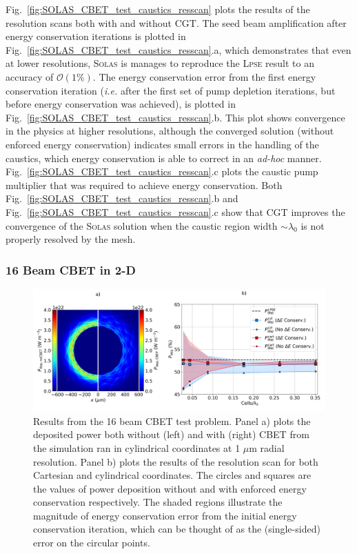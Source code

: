 Fig.~\ref{fig:SOLAS_CBET_test_caustics_resscan} plots the results of the resolution scans both with and without \ac{CGT}.
The seed beam amplification after energy conservation iterations is plotted in Fig.~\ref{fig:SOLAS_CBET_test_caustics_resscan}.a, which demonstrates that even at lower resolutions, \textsc{Solas} is manages to reproduce the \textsc{Lpse} result to an accuracy of $\mathcal{O}(1\%)$.
The energy conservation error from the first energy conservation iteration (\textit{i.e.} after the first set of pump depletion iterations, but before energy conservation was achieved), is plotted in Fig.~\ref{fig:SOLAS_CBET_test_caustics_resscan}.b.
This plot shows convergence in the physics at higher resolutions, although the converged solution (without enforced energy conservation) indicates small errors in the handling of the caustics, which energy conservation is able to correct in an \textit{ad-hoc} manner.
Fig.~\ref{fig:SOLAS_CBET_test_caustics_resscan}.c plots the caustic pump multiplier that was required to achieve energy conservation.
Both Fig.~\ref{fig:SOLAS_CBET_test_caustics_resscan}.b and Fig.~\ref{fig:SOLAS_CBET_test_caustics_resscan}.c show that \ac{CGT} improves the convergence of the \textsc{Solas} solution when the caustic region width $\sim\lambda_0$ is not properly resolved by the mesh.

\subsubsection{16 Beam CBET in 2-D}%
\label{sec:SOLAS_16beam_CBET}

\begin{figure}[t!]
    \includegraphics[width=1.0\linewidth]{Numerics/Images/16beamCBET.png}
    \centering
    \caption{Results from the 16 beam \ac{CBET} test problem.
    Panel a) plots the deposited power both without (left) and with (right) \ac{CBET} from the simulation ran in cylindrical coordinates at 1 $\mu\text{m}$ radial resolution.
    Panel b) plots the results of the resolution scan for both Cartesian and cylindrical coordinates.
    The circles and squares are the values of power deposition without and with enforced energy conservation respectively.
    The shaded regions illustrate the magnitude of energy conservation error from the initial energy conservation iteration, which can be thought of as the (single-sided) error on the circular points.}%
    \label{fig:SOLAS_16CBET_pdep}
\end{figure}

